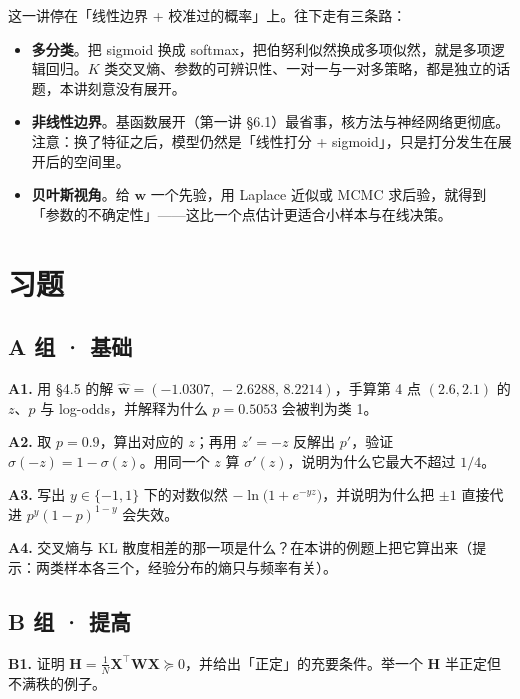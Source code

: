 \documentclass[11pt,a4paper,fontset=windows,zihao=-4]{ctexart}
\newcommand{\bX}{\mathbf{X}}
\newcommand{\bw}{\mathbf{w}}
\newcommand{\bH}{\mathbf{H}}
\newcommand{\bW}{\mathbf{W}}
\newcommand{\tp}{^{\top}}
\begin{document}
这一讲停在「线性边界 + 校准过的概率」上。往下走有三条路：

\begin{itemize}
  \item \textbf{多分类}。把 sigmoid 换成 softmax，把伯努利似然换成多项似然，就是多项逻辑回归。$K$ 类交叉熵、参数的可辨识性、一对一与一对多策略，都是独立的话题，本讲刻意没有展开。
  \item \textbf{非线性边界}。基函数展开（第一讲 \S6.1）最省事，核方法与神经网络更彻底。注意：换了特征之后，模型仍然是「线性打分 + sigmoid」，只是打分发生在展开后的空间里。
  \item \textbf{贝叶斯视角}。给 $\bw$ 一个先验，用 Laplace 近似或 MCMC 求后验，就得到「参数的不确定性」——这比一个点估计更适合小样本与在线决策。
\end{itemize}


\clearpage
\section*{习题}
\setlength{\parskip}{0.62em}

\subsection*{A 组 · 基础}

\noindent\textbf{A1.} 用 \S4.5 的解 $\hat{\bw}=(-1.0307,\,-2.6288,\,8.2214)$，手算第 4 点 $(2.6,2.1)$ 的 $z$、$p$ 与 log-odds，并解释为什么 $p=0.5053$ 会被判为类 1。

\noindent\textbf{A2.} 取 $p=0.9$，算出对应的 $z$；再用 $z'=-z$ 反解出 $p'$，验证 $\sigma(-z)=1-\sigma(z)$。用同一个 $z$ 算 $\sigma'(z)$，说明为什么它最大不超过 $1/4$。

\noindent\textbf{A3.} 写出 $y\in\{-1,1\}$ 下的对数似然 $-\ln\bigl(1+e^{-y z}\bigr)$，并说明为什么把 $\pm1$ 直接代进 $p^{y}(1-p)^{1-y}$ 会失效。

\noindent\textbf{A4.} 交叉熵与 KL 散度相差的那一项是什么？在本讲的例题上把它算出来（提示：两类样本各三个，经验分布的熵只与频率有关）。

\subsection*{B 组 · 提高}

\noindent\textbf{B1.} 证明 $\bH=\frac1N\bX\tp\bW\bX\succeq0$，并给出「正定」的充要条件。举一个 $\bH$ 半正定但不满秩的例子。
\end{document}
